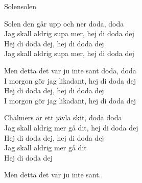 \begin{song}{Solen}{solen}
\begin{vers}
Solen den går upp och ner doda, doda\\
Jag skall aldrig supa mer, hej di doda dej\\
Hej di doda dej, hej di doda dej\\
Jag skall aldrig supa mer, hej di doda dej\\
\end{vers}
\begin{vers}
Men detta det var ju inte sant doda, doda\\
I morgon gör jag likadant, hej di doda dej\\
Hej di doda dej, hej di doda dej\\
I morgon gör jag likadant, hej di doda dej\\
\end{vers}
\begin{vers}
Chalmers är ett jävla skit, doda doda\\
Jag skall aldrig mer gå dit, hej di doda dej\\
Hej di doda dej, hej di doda dej\\
Jag skall aldrig mer gå dit\\
Hej di doda dej\\
\end{vers}
\begin{vers}
Men detta det var ju inte sant..\\
\end{vers}
\end{song}
